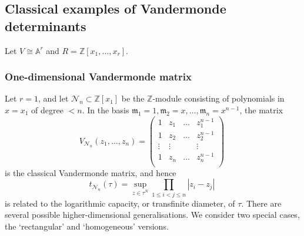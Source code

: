 \documentclass[a4paper,10pt]{amsart}
\theoremstyle{definition}
\theoremstyle{remark}
\numberwithin{equation}{section}
\newcommand{\Z}{\mathbb Z}
\newcommand{\m}{\mathfrak{m}}
\newcommand{\0}{\color{blue}{\mathsf{0}}}
\begin{document}
  \subsection{Classical examples of Vandermonde determinants}  \label{sect: ClassicalVdM} Let  $V \cong \mathbb{A}^r$ and  $R=   \Z[x_1,\ldots, x_r]$. 
  
  \subsubsection{One-dimensional Vandermonde matrix} \label{sect: onedimVdM}  Let $r=1$, and let $\mathcal{N}_{n} \subset \Z[x_1]$ be the $\Z$-module consisting of polynomials in $x=x_1$ of degree $<n$. In the basis
  $\m_1=1, \m_2=x, \ldots, \m_n= x^{n-1}$,  the matrix   
     \[ V_{\mathcal{N}_n}(z_1,\ldots, z_n) =   \begin{pmatrix} 
     1 & z_1 & \ldots &  z_1^{n-1} \\
     1 & z_2 & \ldots &  z_2^{n-1} \\
     \vdots & \vdots  &  & \vdots   \\
     1 & z_n & \ldots &  z_n^{n-1} \\
     \end{pmatrix}   \  \]
  is the classical Vandermonde matrix, and hence 
  \[   t_{\mathcal{N}_n}( \tau ) = \sup_{z\in \tau^N}    \prod_{1\leq i < j \leq n} \left| z_i -z_j     \right|  \   \]
is related to the logarithmic capacity, or  transfinite diameter, of $\tau$.  There are several possible higher-dimensional generalisations. We consider two  special cases, the `rectangular' and `homogeneous' versions.  
  
\end{document}
